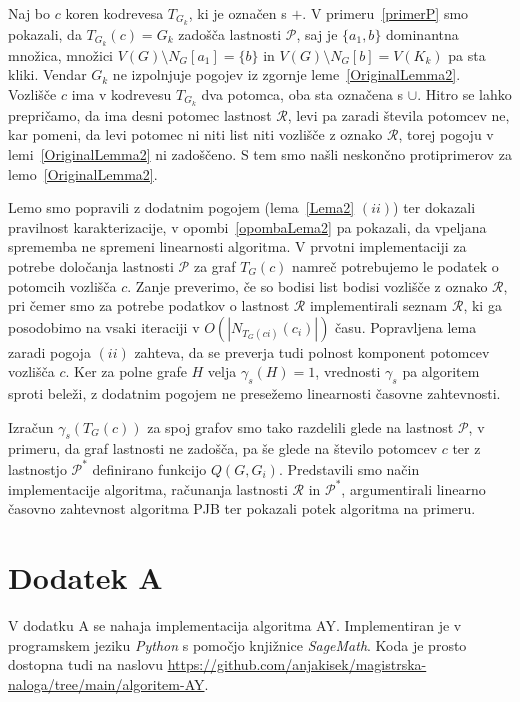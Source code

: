 \documentclass[12pt,a4paper,twoside]{article}
\theoremstyle{definition} %
\theoremstyle{plain} %
\numberwithin{equation}{section}  %
\begin{document}
Naj bo $c$ koren kodrevesa $T_{G_k}$, ki je označen s $+$. V primeru~\ref{primerP} smo pokazali, da $T_{G_k}(c) = G_k$ zadošča lastnosti $\mathcal{P}$, saj je $\{a_1, b\}$ dominantna množica, množici $V(G) \setminus N_G[a_1] = \{b\}$ in $V(G) \setminus N_G[b] = V(K_k)$ pa sta kliki. Vendar $G_k$ ne izpolnjuje pogojev iz zgornje leme~\ref{OriginalLemma2}. Vozlišče $c$ ima v kodrevesu $T_{G_k}$ dva potomca, oba sta označena s $\cup$. Hitro se lahko prepričamo, da ima desni potomec lastnost $\mathcal{R}$, levi pa zaradi števila potomcev ne, kar pomeni, da levi potomec ni niti list niti vozlišče z oznako $\mathcal{R}$, torej pogoju v lemi~\ref{OriginalLemma2} ni zadoščeno. S tem smo našli neskončno protiprimerov za lemo~\ref{OriginalLemma2}.

Lemo smo popravili z dodatnim pogojem (lema~\ref{Lema2} $(ii)$) ter dokazali pravilnost karakterizacije, v opombi~\ref{opombaLema2} pa pokazali, da vpeljana sprememba ne spremeni linearnosti algoritma. V prvotni implementaciji za potrebe določanja lastnosti $\mathcal{P}$ za graf $T_G(c)$ namreč potrebujemo le podatek o potomcih vozlišča $c$. Zanje preverimo, če so bodisi list bodisi vozlišče z oznako $\mathcal{R}$, pri čemer smo za potrebe podatkov o lastnost $\mathcal{R}$ implementirali seznam $\mathcal{R}$, ki ga posodobimo na vsaki iteraciji v $O(|N_{T_G(ci)}(c_i)|)$ času. Popravljena lema zaradi pogoja $(ii)$ zahteva, da se preverja tudi polnost komponent potomcev vozlišča $c$. Ker za polne grafe $H$ velja $\gamma_s(H) = 1$, vrednosti $\gamma_s$ pa algoritem sproti beleži, z dodatnim pogojem ne presežemo linearnosti časovne zahtevnosti.

Izračun $\gamma_s(T_G(c))$ za spoj grafov smo tako razdelili glede na lastnost $\mathcal{P}$, v primeru, da graf lastnosti ne zadošča, pa še glede na število potomcev $c$ ter z lastnostjo $\mathcal{P^*}$ definirano funkcijo $Q(G, G_i)$. Predstavili smo način implementacije algoritma, računanja lastnosti $\mathcal{R}$ in $\mathcal{P^*}$, argumentirali linearno časovno zahtevnost algoritma PJB ter pokazali potek algoritma na primeru.
\vfill
\cleardoublepage     

\section*{Dodatek A}
V dodatku A se nahaja implementacija algoritma AY. Implementiran je v programskem jeziku \emph{Python} s pomočjo knjižnice \emph{SageMath}. Koda je prosto dostopna tudi na naslovu \url{https://github.com/anjakisek/magistrska-naloga/tree/main/algoritem-AY}.
\end{document}
